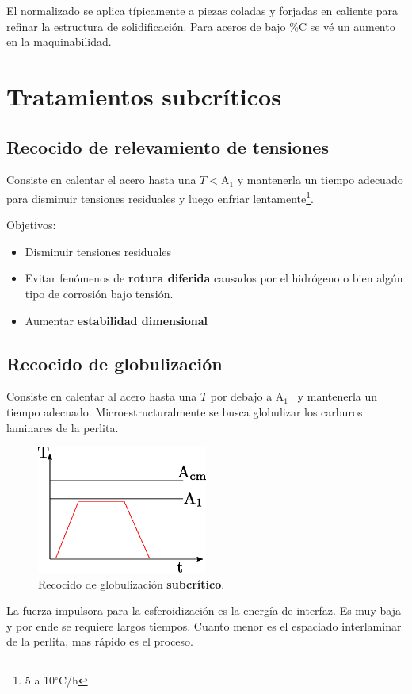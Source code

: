 \documentclass{article}
\newcommand{\Aone}{A\ensuremath{_{1}}}
\newcommand{\grad}{\ensuremath{^\circ \mathrm{C}}}
\begin{document}
El normalizado se aplica típicamente a piezas coladas y forjadas en caliente para refinar la estructura de solidificación. Para aceros de bajo \%C se vé un aumento en la maquinabilidad.
\section{Tratamientos subcríticos}

\subsection{Recocido de relevamiento de tensiones}
Consiste en calentar el acero hasta una $T<$\Aone{} y mantenerla un tiempo adecuado para disminuir tensiones residuales y luego enfriar lentamente\footnote{5 a 10\grad/h}.

Objetivos:
\begin{itemize}
    \item Disminuir tensiones residuales
    \item Evitar fenómenos de \textbf{rotura diferida} causados por el hidrógeno o bien algún tipo de corrosión bajo tensión.
    \item Aumentar \textbf{estabilidad dimensional}
\end{itemize}

\subsection{Recocido de globulización}
Consiste en calentar al acero hasta una $T$ por debajo a \Aone~ y mantenerla un tiempo adecuado. Microestructuralmente se busca globulizar los carburos laminares de la perlita.

\begin{figure}[htb!]
    \centering
    \includegraphics[width=0.5\textwidth]{fig/TTglob.eps}
    \caption{Recocido de globulización \textbf{subcrítico}.}
    \label{fig:TTglob}
\end{figure}

La fuerza impulsora para la esferoidización es la energía de interfaz. Es muy baja y por ende se requiere largos tiempos. Cuanto menor es el espaciado interlaminar de la perlita, mas rápido es el proceso.
\end{document}
